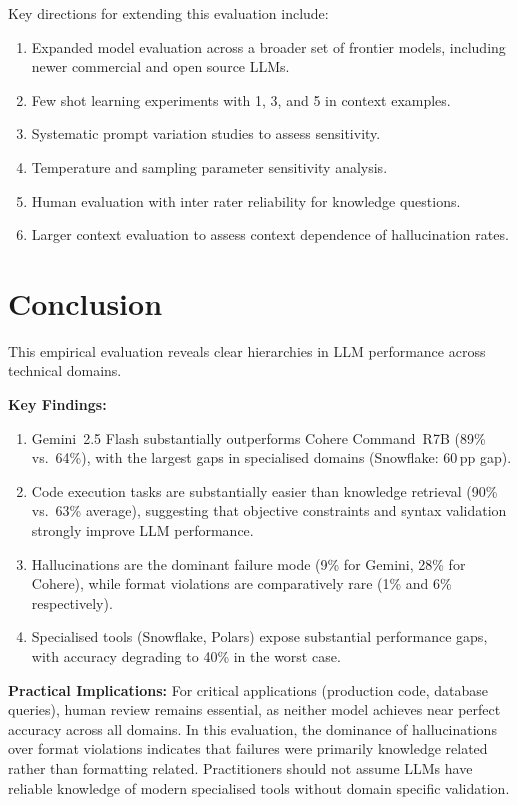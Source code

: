 \documentclass[12pt,a4paper]{article}
\begin{document}
Key directions for extending this evaluation include:
\begin{enumerate}[leftmargin=*]
  \item Expanded model evaluation across a broader set of frontier models, including newer commercial and open source LLMs.
  \item Few shot learning experiments with 1, 3, and 5 in context examples.
  \item Systematic prompt variation studies to assess sensitivity.
  \item Temperature and sampling parameter sensitivity analysis.
  \item Human evaluation with inter rater reliability for knowledge questions.
  \item Larger context evaluation to assess context dependence of hallucination rates.
\end{enumerate}

\section{Conclusion}

This empirical evaluation reveals clear hierarchies in LLM performance across technical domains.

\textbf{Key Findings:}
\begin{enumerate}[leftmargin=*]
  \item Gemini~2.5 Flash substantially outperforms Cohere Command~R7B (89\% vs.\ 64\%), with the largest gaps in specialised domains (Snowflake: 60\,pp gap).
  \item Code execution tasks are substantially easier than knowledge retrieval (90\% vs.\ 63\% average), suggesting that objective constraints and syntax validation strongly improve LLM performance.
  \item Hallucinations are the dominant failure mode (9\% for Gemini, 28\% for Cohere), while format violations are comparatively rare (1\% and 6\% respectively).
  \item Specialised tools (Snowflake, Polars) expose substantial performance gaps, with accuracy degrading to 40\% in the worst case.
\end{enumerate}

\textbf{Practical Implications:}
For critical applications (production code, database queries), human review remains essential, as neither model achieves near perfect accuracy across all domains. In this evaluation, the dominance of hallucinations over format violations indicates that failures were primarily knowledge related rather than formatting related. Practitioners should not assume LLMs have reliable knowledge of modern specialised tools without domain specific validation.
\end{document}
